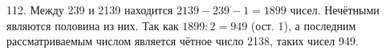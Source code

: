 112. Между 239 и 2139 находится $2139-239-1=1899$ чисел. Нечётными являются половина из них. Так как $1899:2=949$ (ост. 1), а последним рассматриваемым числом является чётное число 2138, таких чисел 949.\\

